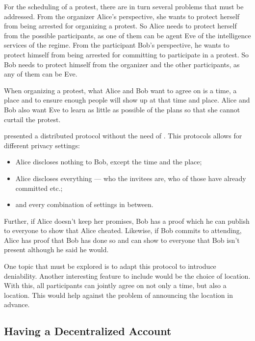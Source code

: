 For the scheduling of a protest, there are in turn several problems that must 
be addressed.
From the organizer Alice's perspective, she wants to protect herself from being 
arrested for organizing a protest.
So Alice needs to protect herself from the possible participants, as one of 
them can be agent Eve of the intelligence services of the regime.
From the participant Bob's perspective, he wants to protect himself from being 
arrested for committing to participate in a protest.
So Bob needs to protect himself from the organizer and the other participants, 
as any of them can be Eve.

When organizing a protest, what Alice and Bob want to agree on is a time, 
a place and to ensure enough people will show up at that time and place.
Alice and Bob also want Eve to learn as little as possible of the plans so 
that she cannot curtail the protest.

\citet{EventsInvitations} presented a distributed protocol without the need of 
.
This protocols allows for different privacy settings:
\begin{itemize}
\item Alice discloses nothing to Bob, except the time and the place;
\item Alice discloses everything --- who the invitees are, who of those have 
  already committed etc.;
\item and every combination of settings in between.
\end{itemize}
Further, if Alice doesn't keep her promises, Bob has a proof which he can 
publish to everyone to show that Alice cheated.
Likewise, if Bob commits to attending, Alice has proof that Bob has done so and 
can show to everyone that Bob isn't present although he said he would.

One topic that must be explored is to adapt this protocol to introduce 
deniability.
Another interesting feature to include would be the choice of location.
With this, all participants can jointly agree on not only a time, but also 
a location.
This would help against the problem of announcing the location in advance.



\subsection{Having a Decentralized Account}
\label{passwd}


